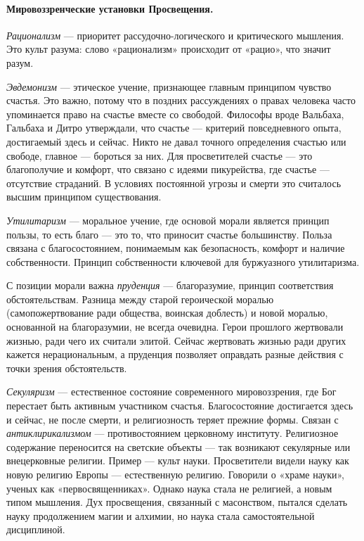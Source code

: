 \paragraph{Мировоззренческие установки Просвещения.}
\textit{Рационализм} --- приоритет рассудочно-логического и критического мышления. Это культ разума: слово «рационализм» происходит от «рацио», что значит разум.

\textit{Эвдемонизм} --- этическое учение, признающее главным принципом чувство счастья. Это важно, потому что в поздних рассуждениях о правах человека часто упоминается право на счастье вместе со свободой. Философы вроде Вальбаха, Гальбаха и Дитро утверждали, что счастье --- критерий повседневного опыта, достигаемый здесь и сейчас. Никто не давал точного определения счастью или свободе, главное --- бороться за них. Для просветителей счастье --- это благополучие и комфорт, что связано с идеями пикурейства, где счастье --- отсутствие страданий. В условиях постоянной угрозы и смерти это считалось высшим принципом существования.

\textit{Утилитаризм} --- моральное учение, где основой морали является принцип пользы, то есть благо --- это то, что приносит счастье большинству. Польза связана с благосостоянием, понимаемым как безопасность, комфорт и наличие собственности. Принцип собственности ключевой для буржуазного утилитаризма.



С позиции морали важна \textit{пруденция} --- благоразумие, принцип соответствия обстоятельствам. Разница между старой героической моралью (самопожертвование ради общества, воинская доблесть) и новой моралью, основанной на благоразумии, не всегда очевидна. Герои прошлого жертвовали жизнью, ради чего их считали элитой. Сейчас жертвовать жизнью ради других кажется нерациональным, а пруденция позволяет оправдать разные действия с точки зрения обстоятельств.

\textit{Секуляризм} --- естественное состояние современного мировоззрения, где Бог перестает быть активным участником счастья. Благосостояние достигается здесь и сейчас, не после смерти, и религиозность теряет прежние формы. Связан с \textit{антиклирикализмом} --- противостоянием церковному институту. Религиозное содержание переносится на светские объекты --- так возникают секулярные или внецерковные религии. Пример --- культ науки. Просветители видели науку как новую религию Европы --- естественную религию. Говорили о «храме науки», ученых как «первосвященниках». Однако наука стала не религией, а новым типом мышления. Дух просвещения, связанный с масонством, пытался сделать науку продолжением магии и алхимии, но наука стала самостоятельной дисциплиной.

